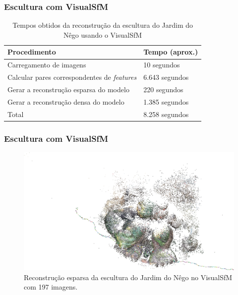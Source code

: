 \documentclass[table, usenames, svgnames, xcolor=dvipsnames]{beamer}
\begin{document}
\begin{frame}
\frametitle{\textbf{Escultura com VisualSfM}}
	\begin{table}
	\caption{Tempos obtidos da reconstrução da escultura do Jardim do Nêgo usando o VisualSfM}
		\begin{tabular}{|l|l|}
			\hline
			Procedimento & Tempo (aprox.) \\ \hline
			Carregamento de imagens & 10 segundos \\ \hline
			Calcular pares correspondentes de \protect\emph{features} & 6.643 segundos \\ \hline
			Gerar a reconstrução esparsa do modelo & 220 segundos \\ \hline
			Gerar a reconstrução densa do modelo & 1.385 segundos \\ \hline
			Total &  8.258 segundos \\ \hline
		\end{tabular}
	\end{table}
\end{frame}

\begin{frame}
\frametitle{\textbf{Escultura com VisualSfM}}
	\begin{figure}[!h]
		\centering
		\includegraphics[width=0.9\linewidth]{figs/guerreiroEsparsa.jpg}
		\caption{%
		Reconstrução esparsa da escultura do Jardim do Nêgo no VisualSfM com 197 imagens.
		}\label{fig:reconstrucaoEsparsaIndioVisualSFM}
	\end{figure}
\end{frame}
\end{document}
